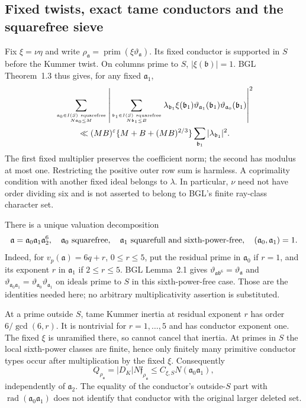 \documentclass[11pt,oneside,openany]{book}
\theoremstyle{definition}\newtheorem{definition}[theorem]{Definition}
\theoremstyle{remark}\newtheorem{remark}[theorem]{Remark}
\begin{document}
\subsection{Fixed twists, exact tame conductors and the squarefree sieve}
Fix $\xi=\nu\eta$ and write
$\rho_{\mathfrak a}=\operatorname{prim}
(\xi\vartheta_{\mathfrak a})$. Its fixed conductor is supported in
$S$ before the Kummer twist. On columns prime to $S$, $|\xi(\mathfrak b)|=1$.
BGL Theorem~1.3 thus gives, for any fixed $\mathfrak a_1$,
\begin{align}\label{mm:ls}
 &\sum_{\mathfrak a_0\in I(S)\ \mathrm{squarefree}\atop N\mathfrak a_0\le M}
 \left|\sum_{\mathfrak b_1\in I(S)\ \mathrm{squarefree}\atop N\mathfrak b_1\le B}
 \lambda_{\mathfrak b_1}\xi(\mathfrak b_1)
 \vartheta_{\mathfrak a_1}(\mathfrak b_1)
 \vartheta_{\mathfrak a_0}(\mathfrak b_1)\right|^2\notag\\
 &\hspace{1cm}\ll (MB)^\varepsilon
 \{M+B+(MB)^{2/3}\}\sum_{\mathfrak b_1}|\lambda_{\mathfrak b_1}|^2.
\end{align}
The first fixed multiplier preserves the coefficient norm; the second
has modulus at most one. Restricting the positive outer row sum is
harmless. A coprimality condition with another fixed ideal belongs to
$\lambda$. In particular, $\nu$ need not have order dividing six and
is not asserted to belong to BGL's finite ray-class character set.

There is a unique valuation decomposition
\[
 \mathfrak a=\mathfrak a_0\mathfrak a_1\mathfrak a_2^6,
 \quad \mathfrak a_0\ \hbox{squarefree},\quad
 \mathfrak a_1\ \hbox{squarefull and sixth-power-free},\quad
 (\mathfrak a_0,\mathfrak a_1)=1.
\]
Indeed, for $v_p(\mathfrak a)=6q+r$, $0\le r\le5$, put the residual
prime in $\mathfrak a_0$ if $r=1$, and its exponent $r$ in
$\mathfrak a_1$ if $2\le r\le5$. BGL Lemma~2.1 gives
$\vartheta_{\mathfrak a\mathfrak b^6}=\vartheta_{\mathfrak a}$ and
$\vartheta_{\mathfrak a_0\mathfrak a_1}
=\vartheta_{\mathfrak a_0}\vartheta_{\mathfrak a_1}$ on ideals
prime to $S$ in this sixth-power-free case. Those are the identities
needed here; no arbitrary multiplicativity assertion is substituted.

At a prime outside $S$, tame Kummer inertia at residual exponent $r$
has order $6/\gcd(6,r)$. It is nontrivial for $r=1,\ldots,5$ and
has conductor exponent one. The fixed $\xi$ is unramified there, so
cannot cancel that inertia. At primes in $S$ the local sixth-power
classes are finite, hence only finitely many primitive conductor types
occur after multiplication by the fixed $\xi$. Consequently
\begin{equation}\label{mm:conductor}
 Q_{\rho_{\mathfrak a}}=|D_K|N\mathfrak f_{\rho_{\mathfrak a}}
 \le C_{\xi,S}N(\mathfrak a_0\mathfrak a_1),
\end{equation}
independently of $\mathfrak a_2$. The equality of the conductor's
outside-$S$ part with $\operatorname{rad}(\mathfrak a_0\mathfrak a_1)$
does not identify that conductor with the original larger deleted set.
\end{document}
